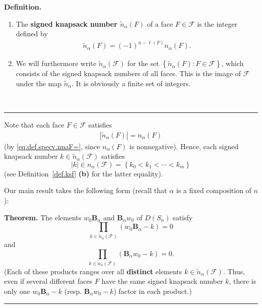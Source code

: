 \documentclass[12pt]{article}
\theoremstyle{definition}%
\newtheorem{thm}{Theorem}[section]
\theoremstyle{definition}%
\newtheorem{defn}[thm]{Definition}
\theoremstyle{remark}%
\newcommand{\tup}[1]{\left( #1 \right)}
\newcommand{\set}[1]{\left\{ #1 \right\}}
\newcommand{\abs}[1]{\left| #1 \right|} %
\newcommand{\dsn}{D\left(S_n\right)}
\newcommand{\BBa}{\mathbf{B}_{\alpha}}
\newcommand{\CF}{\mathcal{F}}
\newcommand{\wo}{w_0} %
\newcommand{\na}{n_{ \alpha } }%
\newcommand{\nna}{\widetilde{n}_{ \alpha } }%
\newcommand{\defin}[1]{\textbf{#1}}
\newenvironment{thm}[1][Theorem]{\noindent\textbf{#1.} }{\ \rule{0.5em}{0.5em}}
\newenvironment{defn}[1][Definition]{\noindent\textbf{#1.} }{\ \rule{0.5em}{0.5em}}
\begin{document}
\begin{defn}\ %
    \label{def.specv}
	
	\begin{enumerate}
	
	\item[\textbf{(a)}] The \defin{signed knapsack number $\nna \tup{F}$}
	of a face $F \in \CF$ is the integer defined by
	\begin{align}
	\nna \tup{F}
	= \tup{-1}^{n-\ell\tup{F}} \na \tup{F} .
	\label{eq.def.specv.nnaF=}
	\end{align}

	\item[\textbf{(b)}]
	We will furthermore write $\nna\tup{\CF}$ for the set
	$\set{\nna\tup{F} : F \in \CF}$, which consists of the
	signed knapsack numbers of all faces.
	This is the image of $ \CF $ under the map $\nna$.
	It is obviously a finite set of integers.
	
	\end{enumerate}
\end{defn}

Note that each face $F\in\CF$ satisfies
\begin{align}
\abs{\nna \tup{F}} = \na\tup{F}
\label{eq.nna.abs}
\end{align}
(by \eqref{eq.def.specv.nnaF=},
since $\na\tup{F}$ is nonnegative).
Hence, each signed knapsack number $k \in \nna\tup{\CF}$
satisfies
\[
\abs{k}
\in n_{\alpha} \tup{\CF}
= \set{ k_0 < k_1 < \cdots < k_{m} }
\]
(see Definition~\ref{def.ksf} \textbf{(b)} for the latter equality).


Our main result takes the following form
(recall that $\alpha$ is a fixed composition of $n$):

\begin{thm}
\label{main.thm.3}
The elements $\wo \BBa$ and $\BBa \wo$ of $\dsn$ satisfy
\begin{equation}
\prod_{k \in \nna\tup{\CF}} \tup{\wo\BBa - k}
=0
\label{eq.main.2a}
\end{equation}
and
\begin{equation}
\prod_{k \in \nna\tup{\CF}} \tup{\BBa\wo - k}
=0.
\label{eq.main.2b}
\end{equation}
(Each of these products ranges over all \textbf{distinct}
elements $k \in \nna\tup{\CF}$. Thus, even if several different
faces $F$ have the same signed knapsack number $k$, there
is only one $\wo\BBa - k$ (resp. $\BBa\wo - k$) factor in
each product.)
\end{thm}
\end{document}
